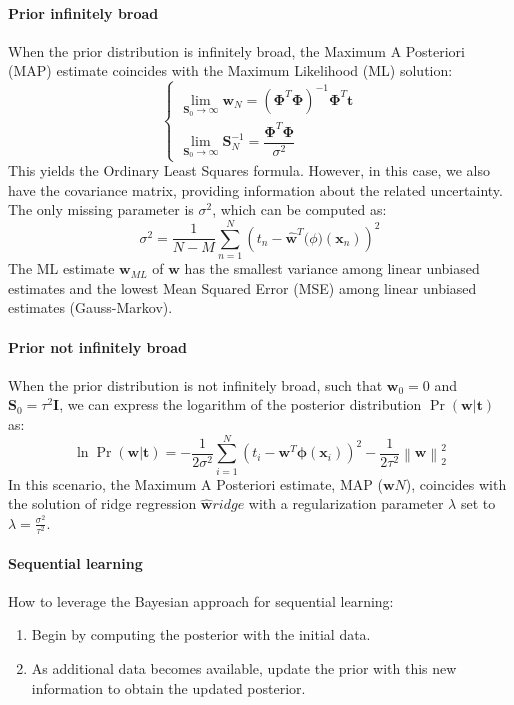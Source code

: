 \paragraph*{Prior infinitely broad}
When the prior distribution is infinitely broad, the Maximum A Posteriori (MAP) estimate coincides with the Maximum Likelihood (ML) solution:
\[\begin{cases}
    \lim_{\mathbf{S}_0\rightarrow\infty}\mathbf{w}_N={\left( \boldsymbol{\Phi}^T\boldsymbol{\Phi} \right)}^{-1}\boldsymbol{\Phi}^T\mathbf{t} \\
    \lim_{\mathbf{S}_0\rightarrow\infty}\mathbf{S}_N^{-1}=\dfrac{\boldsymbol{\Phi}^T\boldsymbol{\Phi}}{\sigma^2}
\end{cases}\]
This yields the Ordinary Least Squares formula.
However, in this case, we also have the covariance matrix, providing information about the related uncertainty.
The only missing parameter is $\sigma^2$, which can be computed as:
\[\sigma^2=\dfrac{1}{N-M}\sum_{n=1}^{N}{\left( t_n-\hat{\mathbf{w}}^T\boldsymbol(\phi)(\mathbf{x}_n) \right)}^2\]
The ML estimate $\mathbf{w}_{ML}$ of $\mathbf{w}$ has the smallest variance among linear unbiased estimates and the lowest Mean Squared Error (MSE) among linear unbiased estimates (Gauss-Markov).

\paragraph*{Prior not infinitely broad}
When the prior distribution is not infinitely broad, such that $\mathbf{w}_0=0$ and $\mathbf{S}_0=\tau^2\mathbf{I}$, we can express the logarithm of the posterior distribution $\Pr(\mathbf{w}|\mathbf{t})$ as:
\[\ln\Pr(\mathbf{w}|\mathbf{t})=-\dfrac{1}{2\sigma^2}\sum_{i=1}^{N}{\left(t_i-\mathbf{w}^T\boldsymbol{\phi}(\mathbf{x}_i)\right)}^2-\dfrac{1}{2\tau^2}{\left\lVert \mathbf{w}\right\rVert}_2^2 \]
In this scenario, the Maximum A Posteriori estimate, MAP ($\mathbf{w}N$), coincides with the solution of ridge regression $\hat{\mathbf{w}}{ridge}$ with a regularization parameter $\lambda$ set to $\lambda=\frac{\sigma^2}{\tau^2}$.

\paragraph*{Sequential learning}
How to leverage the Bayesian approach for sequential learning:
\begin{enumerate}
    \item Begin by computing the posterior with the initial data.
    \item As additional data becomes available, update the prior with this new information to obtain the updated posterior.
\end{enumerate}

